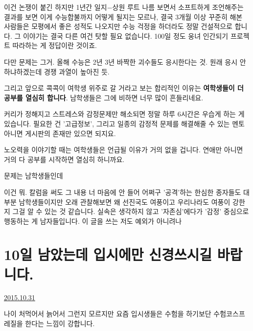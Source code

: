 이건 논쟁이 붙긴 하지만 1년간 일지$-$상원 루트 나름 보면서 소프트하게 조언해주는 결과를 보면
이게 수능합불까지 어떻게 될지는 모르나, 결국 3개월 이상 꾸준히 해본 사람들은 모평에서 좋은 성적도 나오지만
수능 걱정을 하더라도 정말 건설적으로 합니다.
그 이야기는 결국 다른 여건 탓할 필요 없습니다. 100일 정도 웅녀 인간되기 프로젝트 따라하는 게 정답이란 것이죠.
\vspace{5mm}

다만 문제는 그거. 올해 수능은 2년 3년 바짝한 괴수들도 응시한다는 것. 원래 응시 안 하냐하겠는데 경쟁 과열이 높아진 듯.
\vspace{5mm}

그리고 앞으로 콕콕이 여학생 위주로 갈 거라고 보는 합리적인 이유는
\textbf{여학생들이 더 공부를 열심히 합니다}. 남학생들은 그에 비하면 너무 많이 흔들리네요.
\vspace{5mm}

커리가 정해지고 스트레스와 감정문제만 해소되면 정말 하루 6시간은 우습게 하는 게 있습니다.
필요한 건 '고급정보', 그리고 일종의 감정적 문제를 해결해줄 수 있는 멘토 아니면 게시판의 존재만 있으면 되지요.
\vspace{5mm}

노오력을 이야기할 때는 여학생들은 언급될 이유가 거의 없을 겁니다. 연애만 아니면 거의 다 공부를 시작하면 열심히 하니까요.
\vspace{5mm}

문제는 남학생들인데
\vspace{5mm}

이건 뭐. 칼럼을 써도 그 내용 너 마음에 안 들어 어쩌구 '공격'하는 한심한 종자들도 대부분 남학생들이지만
오래 관찰해보면 왜 선진국도 여풍이고 우리나라도 여풍이 강한지 그걸 알 수 있는 것 같습니다.
실속은 생각하지 않고 '자존심'에다가 '감정' 중심으로 행동하는 게 남자들입니다. 이 글을 쓰는 저도 예외가 아니려나
\vspace{5mm}














\section{10일 남았는데 입시에만 신경쓰시길 바랍니다.}
\href{https://www.kockoc.com/Apoc/456618}{2015.10.31}

\vspace{5mm}

나이 처먹어서 늙어서 그런지 모르지만
요즘 입시생들은 수험을 하기보단 수험코스프레질을 한다는 느낌이 강합니다.
\vspace{5mm}

